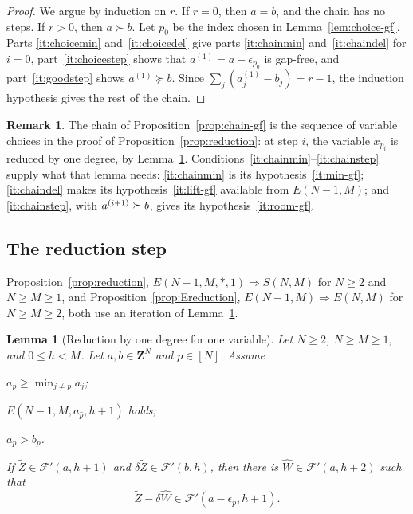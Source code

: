 \documentclass[12pt]{amsart}
\newtheorem{lemma}[theorem]{Lemma}
\theoremstyle{definition}
\newtheorem{remark1}[theorem]{Remark}
\theoremstyle{remark}
\def\what{\hat}
\newcommand{\Z}{\mathbf Z}
\newcommand{\TZ}{\tilde Z}
\newcommand{\FF}{\mathcal F}
\begin{document}
\begin{proof}
We argue by induction on $r$.  If $r=0$, then $a=b$, and the chain has no
steps.  If $r>0$, then $a\succ b$.  Let $p_0$ be the index chosen in
Lemma~\ref{lem:choice-gf}.  Parts \ref{it:choicemin} and~\ref{it:choicedel} give
parts \ref{it:chainmin} and~\ref{it:chaindel} for $i=0$, part~\ref{it:choicestep} shows
that $a^{(1)}=a-\epsilon_{p_0}$ is gap-free, and part~\ref{it:goodstep}
shows $a^{(1)}\succeq b$.
Since $\sum_j(a^{(1)}_j-b_j)=r-1$, the induction hypothesis gives the rest
of the chain.
\end{proof}

\begin{remark1}\label{rem:chain-gf}
The chain of Proposition~\ref{prop:chain-gf} is the sequence of variable
choices in the proof of Proposition~\ref{prop:reduction}: at step $i$, the
variable $x_{p_i}$ is reduced by one degree, by Lemma~\ref{lem:step-gf}.
Conditions~\ref{it:chainmin}--\ref{it:chainstep} supply what
that lemma needs: \ref{it:chainmin} is its hypothesis~\ref{it:min-gf};
\ref{it:chaindel} makes its hypothesis~\ref{it:lift-gf} available from
$E(N-1, M)$; and \ref{it:chainstep}, with $a^{(i+1)}\succeq\nobreak b$, gives its
hypothesis~\ref{it:room-gf}.
\end{remark1}

\subsection{The reduction step}\label{subsec:reduction}



Proposition~\ref{prop:reduction}, $E(N-1, M, *, 1) \Rightarrow S(N, M)$ for $N\geq 2$ and $N \geq M \geq 1$,
and  Proposition~\ref{prop:Ereduction}, $E(N-1, M) \Rightarrow E(N, M)$ for $N \geq M \geq 2$, 
both use an iteration of Lemma~\ref{lem:step-gf}.


\begin{lemma}[Reduction by one degree for one variable]\label{lem:step-gf}
Let $N\ge2$, $N \geq M \geq 1$, and $0\le h<M$.  Let $a,b\in\Z^N$ and $p\in[N]$.  
Assume
\begin{thmlist}
\item\label{it:min-gf} $a_p\ge\min_{j\ne p}a_j$;
\item\label{it:lift-gf} $E(N-1,M,a_{\what p},h+1)$ holds;
\item\label{it:room-gf} $a_p>b_p$.
\end{thmlist}
If $\TZ\in \FF'(a, h+1)$ and $\delta\TZ\in \FF'(b, h)$, then there is $\widehat W\in \FF'(a, h+2)$ such that
\[ \TZ-\delta\widehat W \in \FF'(a-\epsilon_p, h+1). \]
\end{lemma}
\end{document}
